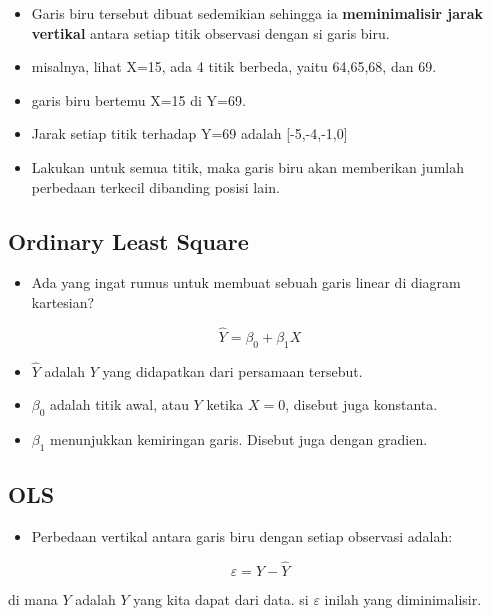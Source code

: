 \documentclass[
  letterpaper,
  DIV=11,
  numbers=noendperiod]{scrartcl}
\providecommand{\tightlist}{%
  \setlength{\itemsep}{0pt}\setlength{\parskip}{0pt}}\usepackage{longtable,booktabs,array}
\begin{document}
\begin{itemize}
\tightlist
\item
  Garis biru tersebut dibuat sedemikian sehingga ia
  \textbf{meminimalisir jarak vertikal} antara setiap titik observasi
  dengan si garis biru.
\item
  misalnya, lihat X=15, ada 4 titik berbeda, yaitu 64,65,68, dan 69.
\item
  garis biru bertemu X=15 di Y=69.
\item
  Jarak setiap titik terhadap Y=69 adalah {[}-5,-4,-1,0{]}
\item
  Lakukan untuk semua titik, maka garis biru akan memberikan jumlah
  perbedaan terkecil dibanding posisi lain.
\end{itemize}

\hypertarget{ordinary-least-square}{%
\subsection{Ordinary Least Square}\label{ordinary-least-square}}

\begin{itemize}
\tightlist
\item
  Ada yang ingat rumus untuk membuat sebuah garis linear di diagram
  kartesian?
\end{itemize}

\[
\hat{Y}=\beta_0+\beta_1 X
\]

\begin{itemize}
\item
  \(\hat{Y}\) adalah \(Y\) yang didapatkan dari persamaan tersebut.
\item
  \(\beta_0\) adalah titik awal, atau \(Y\) ketika \(X=0\), disebut juga
  konstanta.
\item
  \(\beta_1\) menunjukkan kemiringan garis. Disebut juga dengan gradien.
\end{itemize}

\hypertarget{ols}{%
\subsection{OLS}\label{ols}}

\begin{itemize}
\tightlist
\item
  Perbedaan vertikal antara garis biru dengan setiap observasi adalah:
\end{itemize}

\[
\varepsilon=Y-\hat{Y}
\]

di mana \(Y\) adalah \(Y\) yang kita dapat dari data. si \(\varepsilon\)
inilah yang diminimalisir.
\end{document}
